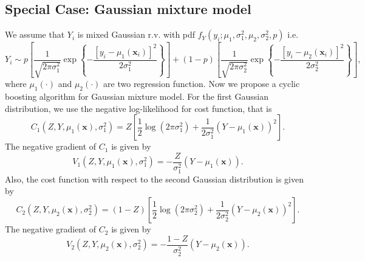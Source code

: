 \documentclass[11pt]{article}
\numberwithin{equation}{section}
\def\bx{\boldsymbol{x}}
\begin{document}
\subsection{Special Case: Gaussian mixture model}
We assume that $Y_i$ is mixed Gaussian r.v. with pdf $f_{Y}(y_i;\mu_1,\sigma_1^2,\mu_2,\sigma_2^2,p)$ i.e.
\begin{equation*}
	Y_i \sim p \left[\frac{1}{\sqrt{2\pi \sigma_1^2}}\exp\left\{-\frac{[y_i-\mu_1(\bx_i)]^2}{2\sigma_1^2}\right\}\right]+(1-p)\left[\frac{1}{\sqrt{2\pi \sigma_2^2}}\exp\left\{-\frac{[y_i-\mu_2(\bx_i)]^2}{2\sigma_2^2}\right\}\right],
\end{equation*}
where $\mu_1(\cdot)$ and $\mu_2(\cdot)$ are two regression function. Now we propose a cyclic boosting algorithm for Gaussian mixture model. For the first Gaussian distribution, we use the negative log-likelihood for cost function, that is 
\begin{equation*}
	C_{1}(Z,Y,\mu_1(\bx),\sigma_1^2)=Z\left[\frac{1}{2}\log(2\pi \sigma_1^2)+\frac{1}{2\sigma_1^2}(Y-\mu_1(\bx))^2\right].
\end{equation*}
The negative gradient of $C_1$ is given by
\begin{equation*}
	V_1(Z,Y,\mu_1(\bx),\sigma_1^2)=-\frac{Z}{\sigma_1^2}(Y-\mu_1(\bx)).
\end{equation*}
Also, the cost function with respect to the second Gaussian distribution is given by
\begin{equation*}
	C_2(Z,Y,\mu_2(\bx),\sigma_2^2)=(1-Z)\left[\frac{1}{2}\log(2\pi \sigma_2^2)+\frac{1}{2\sigma_2^2}(Y-\mu_2(\bx))^2\right].
\end{equation*}
The negative gradient of $C_2$ is given by
\begin{equation*}
	V_2(Z,Y,\mu_2(\bx),\sigma_2^2)=-\frac{1-Z}{\sigma_2^2}(Y-\mu_2(\bx)).
\end{equation*}
\end{document}
